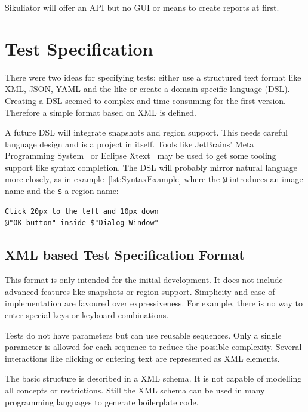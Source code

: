 \documentclass[a4paper,twocolumn,twoside]{article}
\newcommand{\Sik}[0]{Sikuliator}
\begin{document}
\Sik{} will offer an API but no GUI or means to create reports at first.



\section{Test Specification}
There were two ideas for specifying tests: either use a structured text format like XML, JSON, YAML and the like or create a domain specific language (DSL).
Creating a DSL seemed to complex and time consuming for the first version.
Therefore a simple format based on XML is defined.

A future DSL will integrate snapshots and region support.
This needs careful language design and is a project in itself.
Tools like JetBrains' Meta Programming System~\cite{MPS}
or Eclipse Xtext~\cite{Xtext} may be used to get some tooling support like syntax completion.
The DSL will probably mirror natural language more closely, 
as in example~\ref{lst:SyntaxExample} where the \texttt{@} introduces an image name and the \texttt{\$} a region name:

\renewcommand{\lstlistingname}{Example}
\begin{lstlisting}[language=Pseudo,caption={Example for possible syntax},label={lst:SyntaxExample}]
Click 20px to the left and 10px down 
@"OK button" inside $"Dialog Window"
\end{lstlisting}

\subsection*{XML based Test Specification Format}
This format is only intended for the initial development.
It does not include advanced features like snapshots or region support.
Simplicity and ease of implementation are favoured over expressiveness.
For example, there is no way to enter special keys or keyboard combinations.

Tests do not have parameters but can use reusable sequences.
Only a single parameter is allowed for each sequence to reduce the possible complexity.
Several interactions like clicking or entering text are represented as XML elements.

The basic structure is described in a XML schema.
It is not capable of modelling all concepts or restrictions.
Still the XML schema can be used in many programming languages to generate boilerplate code.
\end{document}
